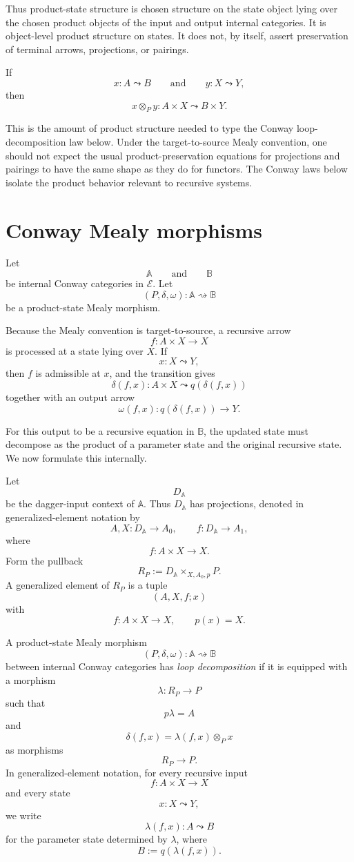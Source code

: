 Thus product-state structure is chosen structure on the state object lying
over the chosen product objects of the input and output internal categories.
It is object-level product structure on states.  It does not, by itself,
assert preservation of terminal arrows, projections, or pairings.

If
\[
x:A\leadsto B
\qquad\text{and}\qquad
y:X\leadsto Y,
\]
then
\[
x\otimes_P y:A\times X\leadsto B\times Y.
\]

This is the amount of product structure needed to type the Conway
loop-decomposition law below.  Under the target-to-source Mealy convention,
one should not expect the usual product-preservation equations for projections
and pairings to have the same shape as they do for functors.  The Conway laws
below isolate the product behavior relevant to recursive systems.

\section{Conway Mealy morphisms}
\label{sec:conway-mealy-morphisms}

Let
\[
\mathbb A
\qquad\text{and}\qquad
\mathbb B
\]
be internal Conway categories in \(\mathcal E\).  Let
\[
(P,\delta,\omega):\mathbb A\rightsquigarrow\mathbb B
\]
be a product-state Mealy morphism.

Because the Mealy convention is target-to-source, a recursive arrow
\[
f:A\times X\to X
\]
is processed at a state lying over \(X\).  If
\[
x:X\leadsto Y,
\]
then \(f\) is admissible at \(x\), and the transition gives
\[
\delta(f,x):A\times X\leadsto q(\delta(f,x))
\]
together with an output arrow
\[
\omega(f,x):q(\delta(f,x))\to Y.
\]

For this output to be a recursive equation in \(\mathbb B\), the updated state
must decompose as the product of a parameter state and the original recursive
state.  We now formulate this internally.

Let
\[
D_{\mathbb A}
\]
be the dagger-input context of \(\mathbb A\).  Thus \(D_{\mathbb A}\) has
projections, denoted in generalized-element notation by
\[
A,X:D_{\mathbb A}\to A_0,
\qquad
f:D_{\mathbb A}\to A_1,
\]
where
\[
f:A\times X\to X.
\]
Form the pullback
\[
R_P
:=
D_{\mathbb A}\times_{X,A_0,p}P.
\]
A generalized element of \(R_P\) is a tuple
\[
(A,X,f;x)
\]
with
\[
f:A\times X\to X,
\qquad
p(x)=X.
\]

\begin{definition}
\label{def:loop-decomposition}
A product-state Mealy morphism
\[
(P,\delta,\omega):\mathbb A\rightsquigarrow\mathbb B
\]
between internal Conway categories has \emph{loop decomposition} if it is
equipped with a morphism
\[
\lambda:R_P\to P
\]
such that
\[
p\lambda=A
\]
and
\[
\delta(f,x)=\lambda(f,x)\otimes_P x
\]
as morphisms
\[
R_P\to P.
\]
In generalized-element notation, for every recursive input
\[
f:A\times X\to X
\]
and every state
\[
x:X\leadsto Y,
\]
we write
\[
\lambda(f,x):A\leadsto B
\]
for the parameter state determined by \(\lambda\), where
\[
B:=q(\lambda(f,x)).
\]
\end{definition}

